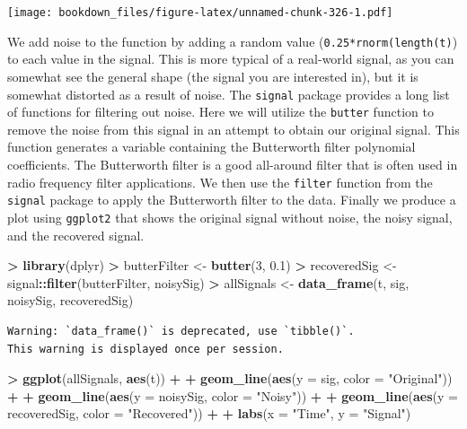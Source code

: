 \documentclass[]{krantz}
\makeatletter
\newenvironment{Shaded}{\begin{snugshade}}{\end{snugshade}}
\newcommand{\KeywordTok}[1]{\textcolor[rgb]{0.27,0.27,0.27}{\textbf{#1}}}
\newcommand{\DataTypeTok}[1]{\textcolor[rgb]{0.27,0.27,0.27}{#1}}
\newcommand{\DecValTok}[1]{\textcolor[rgb]{0.06,0.06,0.06}{#1}}
\newcommand{\FloatTok}[1]{\textcolor[rgb]{0.06,0.06,0.06}{#1}}
\newcommand{\StringTok}[1]{\textcolor[rgb]{0.5,0.5,0.5}{#1}}
\newcommand{\OperatorTok}[1]{\textcolor[rgb]{0.43,0.43,0.43}{\textbf{#1}}}
\newcommand{\NormalTok}[1]{#1}
\newenvironment{kframe}{%
\medskip{}
\setlength{\fboxsep}{.8em}
 \def\at@end@of@kframe{}%
 \ifinner\ifhmode%
  \def\at@end@of@kframe{\end{minipage}}%
  \begin{minipage}{\columnwidth}%
 \fi\fi%
 \def\FrameCommand##1{\hskip\@totalleftmargin \hskip-\fboxsep
 \colorbox{shadecolor}{##1}\hskip-\fboxsep
     \hskip-\linewidth \hskip-\@totalleftmargin \hskip\columnwidth}%
 \MakeFramed {\advance\hsize-\width
   \@totalleftmargin\z@ \linewidth\hsize
   \@setminipage}}%
 {\par\unskip\endMakeFramed%
 \at@end@of@kframe}
\renewenvironment{Shaded}{\begin{kframe}}{\end{kframe}}
\makeatother
\begin{document}
\texttt{[image: bookdown\_files/figure-latex/unnamed-chunk-326-1.pdf]}

We add noise to the function by adding a random value
(\texttt{0.25*rnorm(length(t)}) to each value in the signal. This is
more typical of a real-world signal, as you can somewhat see the general
shape (the signal you are interested in), but it is somewhat distorted
as a result of noise. The \texttt{signal} package provides a long list
of functions for filtering out noise. Here we will utilize the
\texttt{butter} function to remove the noise from this signal in an
attempt to obtain our original signal. This function generates a
variable containing the Butterworth filter polynomial coefficients. The
Butterworth filter is a good all-around filter that is often used in
radio frequency filter applications. We then use the \texttt{filter}
function from the \texttt{signal} package to apply the Butterworth
filter to the data. Finally we produce a plot using \texttt{ggplot2}
that shows the original signal without noise, the noisy signal, and the
recovered signal.

\begin{Shaded}
\begin{Highlighting}[]
\OperatorTok{>}\StringTok{ }\KeywordTok{library}\NormalTok{(dplyr)}
\OperatorTok{>}\StringTok{ }\NormalTok{butterFilter <-}\StringTok{ }\KeywordTok{butter}\NormalTok{(}\DecValTok{3}\NormalTok{, }\FloatTok{0.1}\NormalTok{)}
\OperatorTok{>}\StringTok{ }\NormalTok{recoveredSig <-}\StringTok{ }\NormalTok{signal}\OperatorTok{::}\KeywordTok{filter}\NormalTok{(butterFilter, noisySig)}
\OperatorTok{>}\StringTok{ }\NormalTok{allSignals <-}\StringTok{ }\KeywordTok{data_frame}\NormalTok{(t, sig, noisySig, recoveredSig)}
\end{Highlighting}
\end{Shaded}

\begin{verbatim}
Warning: `data_frame()` is deprecated, use `tibble()`.
This warning is displayed once per session.
\end{verbatim}

\begin{Shaded}
\begin{Highlighting}[]
\OperatorTok{>}\StringTok{ }\KeywordTok{ggplot}\NormalTok{(allSignals, }\KeywordTok{aes}\NormalTok{(t)) }\OperatorTok{+}\StringTok{ }
\OperatorTok{+}\StringTok{   }\KeywordTok{geom_line}\NormalTok{(}\KeywordTok{aes}\NormalTok{(}\DataTypeTok{y =}\NormalTok{ sig, }\DataTypeTok{color =} \StringTok{"Original"}\NormalTok{)) }\OperatorTok{+}\StringTok{ }
\OperatorTok{+}\StringTok{   }\KeywordTok{geom_line}\NormalTok{(}\KeywordTok{aes}\NormalTok{(}\DataTypeTok{y =}\NormalTok{ noisySig, }\DataTypeTok{color =} \StringTok{"Noisy"}\NormalTok{)) }\OperatorTok{+}\StringTok{ }
\OperatorTok{+}\StringTok{   }\KeywordTok{geom_line}\NormalTok{(}\KeywordTok{aes}\NormalTok{(}\DataTypeTok{y =}\NormalTok{ recoveredSig, }\DataTypeTok{color =} \StringTok{"Recovered"}\NormalTok{)) }\OperatorTok{+}\StringTok{ }
\OperatorTok{+}\StringTok{   }\KeywordTok{labs}\NormalTok{(}\DataTypeTok{x =} \StringTok{"Time"}\NormalTok{, }\DataTypeTok{y =} \StringTok{"Signal"}\NormalTok{)}
\end{Highlighting}
\end{Shaded}
\end{document}

